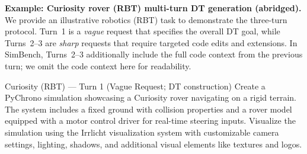 \documentclass{ieeeaccess}
\begin{document}
\begin{table}[h!]
    \centering
    \caption{Sample task requests submitted to the S-LLM.}
    \label{tab:mt_bench_sample}
    \vspace{-10pt}
\end{table}


\medskip
\noindent\textbf{Example: Curiosity rover (RBT) multi-turn DT generation (abridged).}
\label{app:curiosity_example}
We provide an illustrative robotics (RBT) task to demonstrate the three-turn protocol.
Turn~1 is a \emph{vague} request that specifies the overall DT goal, while Turns~2--3 are \emph{sharp} requests that require targeted code edits and extensions.
In SimBench, Turns~2--3 additionally include the full code context from the previous turn; we omit the code context here for readability.

\begin{PromptBlock}{Curiosity (RBT) --- Turn 1 (Vague Request; DT construction)}
    Create a PyChrono simulation showcasing a Curiosity rover navigating on a rigid terrain.
    The system includes a fixed ground with collision properties and a rover model equipped with a motor control driver for real-time steering inputs.
    Visualize the simulation using the Irrlicht visualization system with customizable camera settings, lighting, shadows, and additional visual elements like textures and logos.
    \end{PromptBlock}
    
\end{document}
